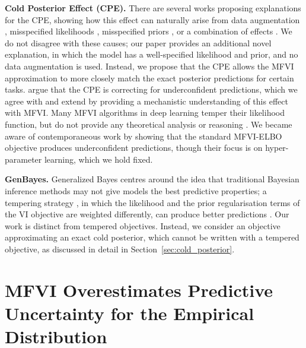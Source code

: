 \documentclass{article}
\theoremstyle{plain}
\theoremstyle{definition}
\theoremstyle{remark}
\theoremstyle{plain}
\begin{document}
\textbf{Cold Posterior Effect (CPE).}
There are several works proposing explanations for the CPE, showing how this effect can naturally arise from data augmentation \citep{izmailov2021bayesian, nabarro2022data, bachmann2022tempering}, misspecified likelihoods \citep{adlam2020cold, aitchison2020statistical}, misspecified priors \cite{fortuin2021bayesian, kapoor2022uncertainty, marek2024can}, or a combination of effects \citep{zeno2020cold, noci2021disentangling}. 
We do not disagree with these causes; our paper provides an additional novel explanation, in which the model has a well-specified likelihood and prior, and no data augmentation is used. Instead, we propose that the CPE allows the MFVI approximation to more closely match the exact posterior predictions for certain tasks. %
\citet{zhang2024cold} argue that the CPE is correcting for underconfident predictions, which we agree with and extend by providing a mechanistic understanding of this effect with MFVI.
Many MFVI algorithms in deep learning temper their likelihood function, but do not provide any theoretical analysis or reasoning \citep[e.g.,][]{osawa2019practical,ashman2022partitioned}. We became aware of contemporaneous work by \citet{harvey2025learning} showing that the standard MFVI-ELBO objective produces underconfident predictions, though their focus is on hyper-parameter learning, which we hold fixed.

\textbf{GenBayes.}
Generalized Bayes centres around the idea that traditional Bayesian inference methods may not give models the best predictive properties; a tempering strategy \cite{aitchison2020statistical}, in which the likelihood and the prior regularisation terms of the VI objective are weighted differently, can produce better predictions \cite{pitas2022cold, mclatchie2025predictive}. Our work is distinct from tempered objectives. Instead, we consider an objective approximating an exact cold posterior, which cannot be written with a tempered objective, as discussed in detail in Section~\ref{sec:cold_posterior}.

\section{MFVI Overestimates Predictive Uncertainty for the Empirical Distribution}
\label{sec:theory}
\end{document}
